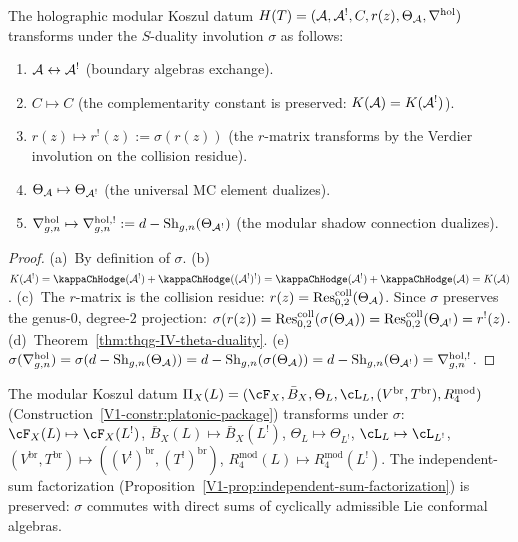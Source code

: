 \begin{proposition}
\label{prop:thqg-IV-holographic-datum}
The holographic modular Koszul datum
$H(T) = (\mathcal{A}, \mathcal{A}^!, C, r(z), \Theta_{\mathcal{A}}, \nabla^{\mathrm{hol}})$
transforms under the $S$-duality involution $\sigma$ as follows:
\begin{enumerate}[label=\textup{(\alph*)}]
\item $\mathcal{A} \leftrightarrow \mathcal{A}^!$ (boundary algebras exchange).
\item $C \mapsto C$ (the complementarity constant is preserved:
 $K(\mathcal{A}) = K(\mathcal{A}^!)$).
\item $r(z) \mapsto r^!(z) := \sigma(r(z))$ (the $r$-matrix
 transforms by the Verdier involution on the collision residue).
\item $\Theta_{\mathcal{A}} \mapsto \Theta_{\mathcal{A}^!}$ (the universal MC element
 dualizes).
\item $\nabla^{\mathrm{hol}}_{g,n} \mapsto \nabla^{\mathrm{hol},!}_{g,n}
 := d - \mathrm{Sh}_{g,n}(\Theta_{\mathcal{A}^!})$ (the modular shadow connection
 dualizes).
\end{enumerate}
\end{proposition}

\begin{proof}
(a)~By definition of $\sigma$.
(b)~$K(\cA^!) = \kappaChHodge(\cA^!) + \kappaChHodge((\cA^!)^!) = \kappaChHodge(\cA^!) + \kappaChHodge(\cA) = K(\cA)$.
(c)~The $r$-matrix is the collision residue:
$r(z) = \operatorname{Res}^{\mathrm{coll}}_{0,2}(\Theta_{\mathcal{A}})$.
Since $\sigma$ preserves the genus-$0$, degree-$2$ projection:
$\sigma(r(z)) = \operatorname{Res}^{\mathrm{coll}}_{0,2}(\sigma(\Theta_{\mathcal{A}}))
= \operatorname{Res}^{\mathrm{coll}}_{0,2}(\Theta_{\mathcal{A}^!}) = r^!(z)$.
(d)~Theorem~\ref{thm:thqg-IV-theta-duality}.
(e)~$\sigma(\nabla^{\mathrm{hol}}_{g,n})
= \sigma(d - \mathrm{Sh}_{g,n}(\Theta_{\mathcal{A}}))
= d - \mathrm{Sh}_{g,n}(\sigma(\Theta_{\mathcal{A}}))
= d - \mathrm{Sh}_{g,n}(\Theta_{\mathcal{A}^!})
= \nabla^{\mathrm{hol},!}_{g,n}$.
\end{proof}

\begin{remark}
The modular Koszul datum $\Pi_X(L) = (\cF_X, \bar{B}_X, \Theta_L, \cL_L,
(V^{\mathrm{br}}, T^{\mathrm{br}}), R_4^{\mathrm{mod}})$
(Construction~\ref{V1-constr:platonic-package}) transforms under $\sigma$:
$\cF_X(L) \mapsto \cF_X(L^!)$,
$\bar{B}_X(L) \mapsto \bar{B}_X(L^!)$,
$\Theta_L \mapsto \Theta_{L^!}$,
$\cL_L \mapsto \cL_{L^!}$,
$(V^{\mathrm{br}}, T^{\mathrm{br}}) \mapsto ((V^!)^{\mathrm{br}}, (T^!)^{\mathrm{br}})$,
$R_4^{\mathrm{mod}}(L) \mapsto R_4^{\mathrm{mod}}(L^!)$.
The independent-sum factorization
(Proposition~\ref{V1-prop:independent-sum-factorization}) is preserved:
$\sigma$ commutes with direct sums of cyclically admissible Lie
conformal algebras.
\end{remark}

